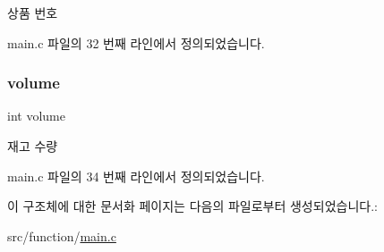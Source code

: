 상품 번호 



main.\+c 파일의 32 번째 라인에서 정의되었습니다.

\mbox{\label{structinventory_aed48ca0bcd2162fd4fd495873e2631f5}} 
\subsubsection{\texorpdfstring{volume}{volume}}
{\footnotesize\ttfamily int volume}



재고 수량 



main.\+c 파일의 34 번째 라인에서 정의되었습니다.



이 구조체에 대한 문서화 페이지는 다음의 파일로부터 생성되었습니다.\+:\begin{DoxyCompactItemize}
\item 
src/function/\hyperlink{function_2main_8c}{main.\+c}\end{DoxyCompactItemize}
